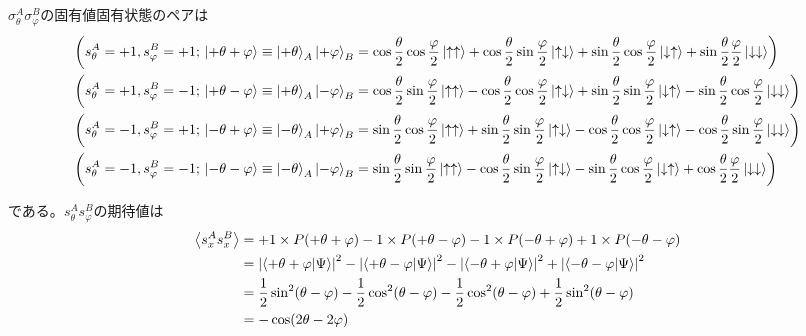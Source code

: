 \documentclass[../../sp_2019.tex]{subfiles}
\begin{document}
\subsection{}
\(\sigma_\theta^A\sigma_\varphi^B\)の固有値固有状態のペアは
\begin{equation}\begin{aligned}[b]
    &\qty(s_\theta^A = +1,s_\varphi^B = +1;\,\ket{+\theta+\varphi} \equiv \ket{+\theta}_A\ket{+\varphi}_B
        =\cos\frac{\theta}{2}\cos\frac{\varphi}{2}\ket{\uparrow\uparrow}+\cos\frac{\theta}{2}\sin\frac{\varphi}{2}\ket{\uparrow\downarrow}
        +\sin\frac{\theta}{2}\cos\frac{\varphi}{2}\ket{\downarrow\uparrow}+\sin\frac{\theta}{2}\frac{{\varphi}}{2}\ket{\downarrow\downarrow})\\
    &\qty(s_\theta^A = +1,s_\varphi^B = -1;\,\ket{+\theta-\varphi} \equiv \ket{+\theta}_A\ket{-\varphi}_B
        =\cos\frac{\theta}{2}\sin\frac{\varphi}{2}\ket{\uparrow\uparrow}-\cos\frac{\theta}{2}\cos\frac{\varphi}{2}\ket{\uparrow\downarrow}
        +\sin\frac{\theta}{2}\sin\frac{\varphi}{2}\ket{\downarrow\uparrow}-\sin\frac{\theta}{2}\cos\frac{\varphi}{2}\ket{\downarrow\downarrow})\\
    &\qty(s_\theta^A = -1,s_\varphi^B = +1;\,\ket{-\theta+\varphi} \equiv \ket{-\theta}_A\ket{+\varphi}_B
        =\sin\frac{\theta}{2}\cos\frac{\varphi}{2}\ket{\uparrow\uparrow}+\sin\frac{\theta}{2}\sin\frac{\varphi}{2}\ket{\uparrow\downarrow}
        -\cos\frac{\theta}{2}\cos\frac{\varphi}{2}\ket{\downarrow\uparrow}-\cos\frac{\theta}{2}\sin\frac{\varphi}{2}\ket{\downarrow\downarrow})\\
    &\qty(s_\theta^A = -1,s_\varphi^B = -1;\,\ket{-\theta-\varphi} \equiv \ket{-\theta}_A\ket{-\varphi}_B
        =\sin\frac{\theta}{2}\sin\frac{\varphi}{2}\ket{\uparrow\uparrow}-\cos\frac{\theta}{2}\sin\frac{\varphi}{2}\ket{\uparrow\downarrow}
        -\sin\frac{\theta}{2}\cos\frac{\varphi}{2}\ket{\downarrow\uparrow}+\cos\frac{\theta}{2}\frac{\varphi}{2}\ket{\downarrow\downarrow})\\
\end{aligned}\end{equation}
である。\(s_\theta^As_\varphi^B\)の期待値は
\begin{equation}\begin{aligned}[b]
    \ev{s_x^As_x^B}
    &= +1\times P(+\theta+\varphi) -1\times P(+\theta-\varphi)
        -1\times P(-\theta+\varphi) +1\times P(-\theta-\varphi)\\
    &= \abs{\braket{+\theta+\varphi}{\Psi}}^2 -\abs{\braket{+\theta-\varphi}{\Psi}}^2
        -\abs{\braket{-\theta+\varphi}{\Psi}}^2+\abs{\braket{-\theta-\varphi}{\Psi}}^2\\
    &= \frac{1}{2}\sin^2(\theta-\varphi) -\frac{1}{2}\cos^2(\theta-\varphi) -\frac{1}{2}\cos^2(\theta-\varphi) + \frac{1}{2}\sin^2(\theta-\varphi) \\
    &= -\cos(2\theta-2\varphi)
\end{aligned}\end{equation}
\end{document}
